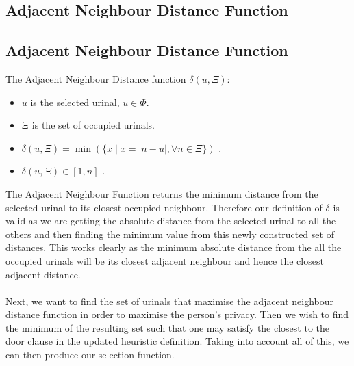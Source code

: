 \documentclass{article}
\begin{document}
\subsection{Adjacent Neighbour Distance Function}
\begin{framed}
    \section*{Adjacent Neighbour Distance Function}
      The Adjacent Neighbour Distance function $\delta(u, \Xi)$:
      \begin{itemize}
          \item $u$ is the selected urinal, $u \in \Phi$.
          \item $\Xi$ is the set of occupied urinals.
          \item $\delta(u, \Xi) = \min(\{x \mid x = \left| n - u \right| , \forall n \in \Xi\})$ .
          \item $\delta(u, \Xi) \in [1, n]$ .
      \end{itemize}
  \end{framed}
The Adjacent Neighbour Function returns the minimum distance from the selected urinal to its closest occupied neighbour. Therefore our definition of $\delta$ is valid as we are getting the absolute distance from the selected urinal to all the others and then finding the minimum value from this newly constructed set of distances. This works clearly as the minimum absolute distance from the all the occupied urinals will be its closest adjacent neighbour and hence the closest adjacent distance. \hfill\qedsymbol\\\\
Next, we want to find the set of urinals that maximise the adjacent neighbour distance function in order to maximise the person's privacy. Then we wish to find the minimum of the resulting set such that one may satisfy the closest to the door clause in the updated heuristic definition. Taking into account all of this, we can then produce our selection function.
\end{document}
